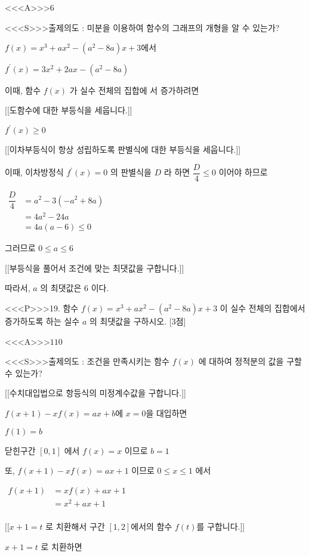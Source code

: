 \documentclass{oblivoir}
\begin{document}
<<<A>>>$6$

<<<S>>>출제의도 : 미분을 이용하여 함수의 그래프의 개형을 알 수 있는가?

$f(x)=x^{3}+a x^{2}-\left(a^{2}-8 a\right) x+3$에서

$f^{\prime}(x)=3 x^{2}+2 a x-\left(a^{2}-8 a\right)$

이때, 함수 $f(x)$ 가 실수 전체의 집합에 서 증가하려면

[[도함수에 대한 부등식을 세웁니다.]]

$f^{\prime}(x) \geq 0$

[[이차부등식이 항상 성립하도록 판별식에 대한 부등식을 세웁니다.]]

이때, 이차방정식 $f^{\prime}(x)=0$ 의 판별식을 $D$ 라 하면 $\dfrac{D}{4} \leq 0$ 이어야 하므로

$\begin{aligned} \dfrac{D}{4} &=a^{2}-3\left(-a^{2}+8 a\right)\\
&=4 a^{2}-24 a\\
&=4 a(a-6) \leq 0 \end{aligned}$

그러므로 $0 \leq a \leq 6$

[[부등식을 풀어서 조건에 맞는 최댓값을 구합니다.]]

따라서, $a$ 의 최댓값은 $6$ 이다.



<<<P>>>19. 함수 $f(x)=x^{3}+a x^{2}-\left(a^{2}-8 a\right) x+3$ 이 실수 전체의 집합에서 증가하도록 하는 실수 $a$ 의 최댓값을 구하시오. [3점]


<<<A>>>$110$

<<<S>>>출제의도 : 조건을 만족시키는 함수 $f(x)$ 에 대하여 정적분의 값을 구할 수 있는가?

[[수치대입법으로 항등식의 미정계수값을 구합니다.]]

$f(x+1)-x f(x)=a x+b$에 $x=0$을 대입하면

$f(1)=b$

닫힌구간 $[0,1]$ 에서 $f(x)=x$ 이므로 $b=1$

또, $f(x+1)-x f(x)=a x+1$ 이므로 $0 \leq x \leq 1$ 에서

$\begin{aligned} f(x+1) &=x f(x)+a x+1\\
&=x^{2}+a x+1\\
\end{aligned}$

[[$x+1=t$ 로 치환해서 구간 $[1, 2]$에서의 함수 $f(t)$를 구합니다.]]

$x+1=t$ 로 치환하면
\end{document}
